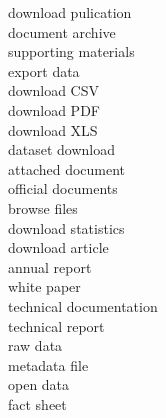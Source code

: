 download pulication\\
document archive\\
supporting materials\\
export data\\
download CSV\\
download PDF\\
download XLS\\
dataset download\\
attached document\\
official documents\\
browse files\\
download statistics\\
download article\\
annual report\\
white paper\\
technical documentation\\
technical report\\
raw data\\
metadata file\\
open data\\
fact sheet\\
